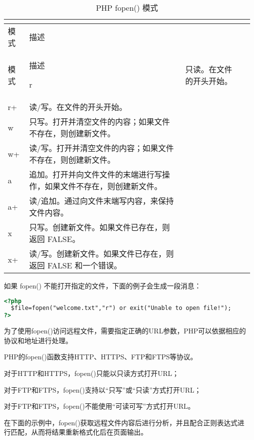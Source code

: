 \begin{longtable}{|m{50pt}|m{300pt}|}
\tabularnewline\hline
模式	&描述
\endhead

\caption{PHP fopen() 模式}\\
\hline
模式	&描述
\endfirsthead

\endfoot

\endlastfoot

\hline
r	&只读。在文件的开头开始。\\
\hline
r+	&读/写。在文件的开头开始。\\
\hline
w	&只写。打开并清空文件的内容；如果文件不存在，则创建新文件。\\
\hline
w+	&读/写。打开并清空文件的内容；如果文件不存在，则创建新文件。\\
\hline
a	&追加。打开并向文件文件的末端进行写操作，如果文件不存在，则创建新文件。\\
\hline
a+	&读/追加。通过向文件末端写内容，来保持文件内容。\\
\hline
x	&只写。创建新文件。如果文件已存在，则返回 FALSE。\\
\hline
x+	&读/写。创建新文件。如果文件已存在，则返回 FALSE 和一个错误。\\
\hline
\end{longtable}

如果 fopen() 不能打开指定的文件，下面的例子会生成一段消息：


\begin{lstlisting}[language=HTML]
<?php
  $file=fopen("welcome.txt","r") or exit("Unable to open file!");
?>
\end{lstlisting}


为了使用fopen()访问远程文件，需要指定正确的URL参数，PHP可以依据相应的协议和地址进行处理。

PHP的fopen()函数支持HTTP、HTTPS、FTP和FTPS等协议。

\begin{compactitem}
\item 对于HTTP和HTTPS，fopen()只能以只读方式打开URL；
\item 对于FTP和FTPS，fopen()支持以“只写”或“只读”方式打开URL；
\item 对于FTP和FTPS，fopen()不能使用“可读可写”方式打开URL。
\end{compactitem}

在下面的示例中，fopen()获取远程文件内容后进行分析，并且配合正则表达式进行匹配，从而将结果重新格式化后在页面输出。


